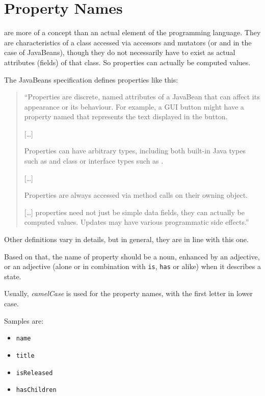 \section{Property Names}\label{sec:NamesOfProperties}
 are more of a concept than an actual element of the \Java programming language. They are characteristics of a class accessed via accessors and mutators (or  and  in the case of JavaBeans), though they do not necessarily have to exist as actual attributes (fields) of that class. So properties can actually be computed values. 

The JavaBeans specification \autocite{ORACLE_DOC_JAVABEANS:Chapter7} defines properties like this:
\begin{quote}
``Properties are discrete, named attributes of a JavaBean that can affect its appearance or its behaviour. For example, a GUI button might have a property named  that represents the text displayed in the button.

[…]

Properties can have arbitrary types, including both built-in Java types such as  and class or interface types such as .

[…]

Properties are always accessed via method calls on their owning object.

[…] properties need not just be simple data fields, they can actually be computed values. Updates may have various programmatic side effects.''
\end{quote}

Other definitions vary in details, but in general, they are in line with this one.

Based on that, the name of property should be a noun, enhanced by an adjective, or an adjective (alone or in combination with \lstinline|is|, \lstinline|has| or alike) when it describes a state.

Usually, \textit{camelCase} is used for the property names, with the first letter in lower case.

Samples are:
\begin{itemize}[nosep]
	\item{\verb#name#}
	\item{\verb#title#}
	\item{\verb#isReleased#}
	\item{\verb#hasChildren#}
\end{itemize}

